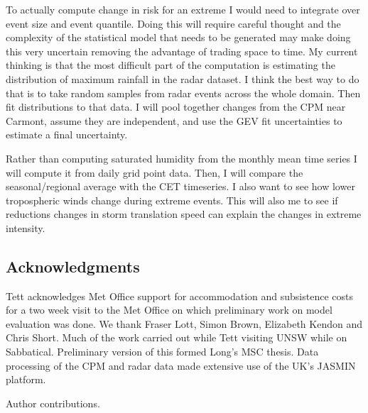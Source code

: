 \documentclass[11pt,a4paper]{article}
\begin{document}
 
 To actually  compute change in risk for an extreme I would need to integrate over event size and event quantile. Doing this will require careful thought and the complexity of the statistical model  that needs to be generated may make doing this very uncertain removing the advantage of trading space to time.  My current thinking is that the most difficult part of the computation is estimating the distribution of maximum rainfall in the radar dataset. I think the best way to do that is to take random samples from radar events across the whole domain. Then fit distributions to that data.  I will pool together changes from the CPM near Carmont, assume they are independent, and use the GEV fit  uncertainties to estimate a final uncertainty. 

 
Rather than computing saturated humidity from the monthly mean time series I will compute it from daily grid point data. Then, I will compare the seasonal/regional average with the CET timeseries.  I also want to see how lower tropospheric  winds change during extreme events. This will also me to see if reductions changes in storm translation speed can explain the changes in extreme intensity. 

\printbibliography %

\subsection{Acknowledgments}
Tett acknowledges  Met Office support for accommodation and subsistence costs for a two week visit to the Met Office on which preliminary work on model evaluation was done. We thank Fraser Lott, Simon Brown, Elizabeth Kendon and Chris Short. Much of the  work carried out while Tett visiting UNSW while on Sabbatical. Preliminary version of this formed Long's MSC thesis.  Data processing of the CPM and radar data made extensive use of the UK's JASMIN platform. 

Author contributions. 
\pagebreak
\end{document}
